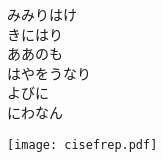 ﻿\documentclass[10pt,a5j]{tarticle} %
\begin{document}
\begin{enumerate}
\begin{minipage}[c]{\blocksize}
		\item
		みみりはけ\\
		きにはり\\
		ああのも\\
		はやをうなり\\
		よびに\\
		にわなん\\
	
	\end{minipage}
	\begin{minipage}[c]{\blocksize}
		
		\texttt{[image: cisefrep.pdf]}
	
	\end{minipage}
\end{enumerate}
\end{document}
